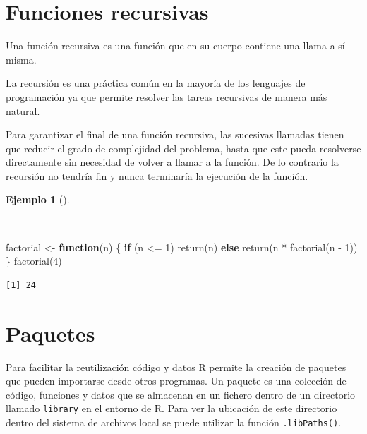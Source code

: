 \documentclass[
  a4paper,
]{scrreport}
\newenvironment{Shaded}{\begin{snugshade}}{\end{snugshade}}
\newcommand{\ControlFlowTok}[1]{\textcolor[rgb]{0.00,0.23,0.31}{\textbf{#1}}}
\newcommand{\DecValTok}[1]{\textcolor[rgb]{0.68,0.00,0.00}{#1}}
\newcommand{\FunctionTok}[1]{\textcolor[rgb]{0.28,0.35,0.67}{#1}}
\newcommand{\NormalTok}[1]{\textcolor[rgb]{0.00,0.23,0.31}{#1}}
\newcommand{\OtherTok}[1]{\textcolor[rgb]{0.00,0.23,0.31}{#1}}
\newcommand{\SpecialCharTok}[1]{\textcolor[rgb]{0.37,0.37,0.37}{#1}}
\theoremstyle{definition}
\theoremstyle{definition}
\newtheorem{example}{Ejemplo}[chapter]
\theoremstyle{remark}
\begin{document}
\section{Funciones recursivas}\label{funciones-recursivas}

Una función recursiva es una función que en su cuerpo contiene una llama
a sí misma.

La recursión es una práctica común en la mayoría de los lenguajes de
programación ya que permite resolver las tareas recursivas de manera más
natural.

Para garantizar el final de una función recursiva, las sucesivas
llamadas tienen que reducir el grado de complejidad del problema, hasta
que este pueda resolverse directamente sin necesidad de volver a llamar
a la función. De lo contrario la recursión no tendría fin y nunca
terminaría la ejecución de la función.

\begin{example}[]\protect\hypertarget{exm-funcion-recursiva}{}\label{exm-funcion-recursiva}

~

\begin{Shaded}
\begin{Highlighting}[]
\NormalTok{factorial }\OtherTok{\textless{}{-}} \ControlFlowTok{function}\NormalTok{(n) \{}
  \ControlFlowTok{if}\NormalTok{ (n }\SpecialCharTok{\textless{}=} \DecValTok{1}\NormalTok{) }\FunctionTok{return}\NormalTok{(n)}
  \ControlFlowTok{else} \FunctionTok{return}\NormalTok{(n }\SpecialCharTok{*} \FunctionTok{factorial}\NormalTok{(n }\SpecialCharTok{{-}} \DecValTok{1}\NormalTok{))}
\NormalTok{\}}
\FunctionTok{factorial}\NormalTok{(}\DecValTok{4}\NormalTok{)}
\end{Highlighting}
\end{Shaded}

\begin{verbatim}
[1] 24
\end{verbatim}

\end{example}

\section{Paquetes}\label{paquetes}

Para facilitar la reutilización código y datos R permite la creación de
paquetes que pueden importarse desde otros programas. Un paquete es una
colección de código, funciones y datos que se almacenan en un fichero
dentro de un directorio llamado \texttt{library} en el entorno de R.
Para ver la ubicación de este directorio dentro del sistema de archivos
local se puede utilizar la función \texttt{.libPaths()}.
\end{document}
